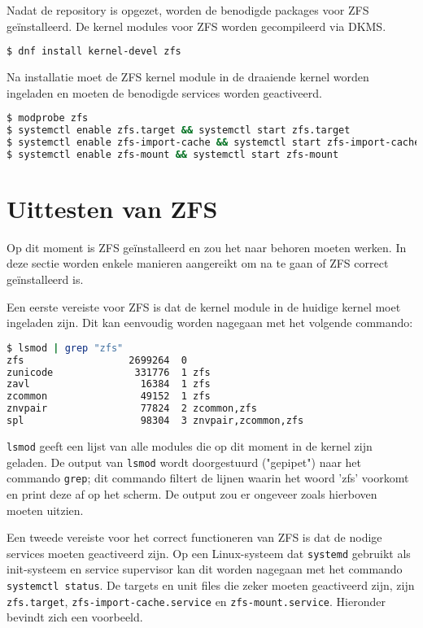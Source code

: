 Nadat de repository is opgezet, worden de benodigde packages voor ZFS geïnstalleerd. De kernel modules voor ZFS worden gecompileerd via DKMS.

\begin{lstlisting}[language=bash,style=command_style]
$ dnf install kernel-devel zfs 
\end{lstlisting}

Na installatie moet de ZFS kernel module in de draaiende kernel worden ingeladen en moeten de benodigde services worden geactiveerd.

\begin{lstlisting}[language=bash,style=command_style]
$ modprobe zfs
$ systemctl enable zfs.target && systemctl start zfs.target
$ systemctl enable zfs-import-cache && systemctl start zfs-import-cache
$ systemctl enable zfs-mount && systemctl start zfs-mount
\end{lstlisting}

\section{Uittesten van ZFS}

Op dit moment is ZFS geïnstalleerd en zou het naar behoren moeten werken. In deze sectie worden enkele manieren aangereikt om na te gaan of ZFS correct geïnstalleerd is.

Een eerste vereiste voor ZFS is dat de kernel module in de huidige kernel moet ingeladen zijn. Dit kan eenvoudig worden nagegaan met het volgende commando:

\begin{lstlisting}[language=bash,style=command_style]
$ lsmod | grep "zfs"
zfs                  2699264  0
zunicode              331776  1 zfs
zavl                   16384  1 zfs
zcommon                49152  1 zfs
znvpair                77824  2 zcommon,zfs
spl                    98304  3 znvpair,zcommon,zfs
\end{lstlisting}

\texttt{lsmod} geeft een lijst van alle modules die op dit moment in de kernel zijn geladen. De output van \texttt{lsmod} wordt doorgestuurd ("gepipet") naar het commando \texttt{grep}; dit commando filtert de lijnen waarin het woord 'zfs' voorkomt en print deze af op het scherm. De output zou er ongeveer zoals hierboven moeten uitzien.

Een tweede vereiste voor het correct functioneren van ZFS is dat de nodige services moeten geactiveerd zijn. Op een Linux-systeem dat \texttt{systemd} gebruikt als init-systeem en service supervisor kan dit worden nagegaan met het commando \texttt{systemctl status}. De targets en unit files die zeker moeten geactiveerd zijn, zijn \texttt{zfs.target}, \texttt{zfs-import-cache.service} en \texttt{zfs-mount.service}. Hieronder bevindt zich een voorbeeld. 


